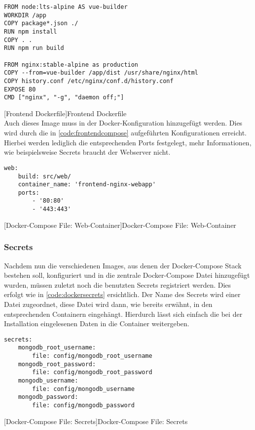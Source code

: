 \begin{verbatim}
FROM node:lts-alpine AS vue-builder
WORKDIR /app
COPY package*.json ./
RUN npm install
COPY . .
RUN npm run build
	
FROM nginx:stable-alpine as production
COPY --from=vue-builder /app/dist /usr/share/nginx/html
COPY history.conf /etc/nginx/conf.d/history.conf
EXPOSE 80
CMD ["nginx", "-g", "daemon off;"]
\end{verbatim}
[Frontend Dockerfile]{Frontend Dockerfile}
\label{code:dockerfrontend}
~\\
Auch dieses Image muss in der Docker-Konfiguration hinzugefügt werden. Dies wird durch die in \autoref{code:frontendcompose} aufgeführten Konfigurationen erreicht. Hierbei werden lediglich die entsprechenden Ports festgelegt, mehr Informationen, wie beispielsweise Secrets braucht der Webserver nicht.

\begin{verbatim}
web:
	build: src/web/
	container_name: 'frontend-nginx-webapp'
	ports:
		- '80:80'
		- '443:443'
\end{verbatim}
[Docker-Compose File: Web-Container]{Docker-Compose File: Web-Container}
\label{code:frontendcompose}

\newpage

\subsubsection{Secrets}

Nachdem nun die verschiedenen Images, aus denen der Docker-Compose Stack bestehen soll, konfiguriert und in die zentrale Docker-Compose Datei hinzugefügt wurden, müssen zuletzt noch die benutzten Secrets registriert werden. \cite{secretmongo} Dies erfolgt wie in \autoref{code:dockersecrets} ersichtlich. Der Name des Secrets wird einer Datei zugeordnet, diese Datei wird dann, wie bereits erwähnt, in den entsprechenden Containern eingehängt. Hierdurch lässt sich einfach die bei der Installation eingelesenen Daten in die Container weitergeben.

\begin{verbatim}
secrets:
	mongodb_root_username:
		file: config/mongodb_root_username
	mongodb_root_password:
		file: config/mongodb_root_password
	mongodb_username:
		file: config/mongodb_username
	mongodb_password:
		file: config/mongodb_password
\end{verbatim}
[Docker-Compose File: Secrets]{Docker-Compose File: Secrets}
\label{code:dockersecrets}

